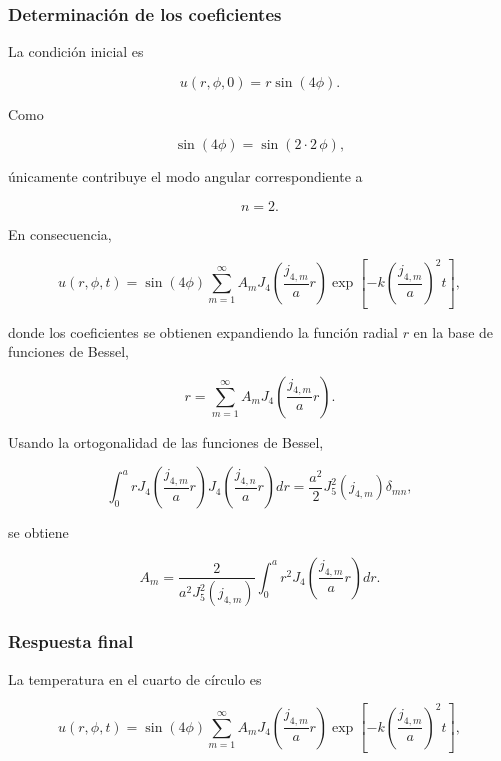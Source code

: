 \documentclass[12pt]{article}
\begin{document}
\subsubsection*{Determinación de los coeficientes}

La condición inicial es

\begin{equation}
u(r,\phi,0)=r\sin(4\phi).
\end{equation}

Como

\[
\sin(4\phi)=\sin(2\cdot2\,\phi),
\]

únicamente contribuye el modo angular correspondiente a

\[
n=2.
\]

En consecuencia,

\begin{equation}
u(r,\phi,t)
=
\sin(4\phi)
\sum_{m=1}^{\infty}
A_m
J_4
\!\left(
\frac{j_{4,m}}{a}r
\right)
\exp
\!\left[
-k
\left(
\frac{j_{4,m}}{a}
\right)^2
t
\right],
\end{equation}

donde los coeficientes se obtienen expandiendo la función radial $r$ en la base de funciones de Bessel,

\begin{equation}
r
=
\sum_{m=1}^{\infty}
A_m
J_4
\!\left(
\frac{j_{4,m}}{a}r
\right).
\end{equation}

Usando la ortogonalidad de las funciones de Bessel,

\begin{equation}
\int_0^a
r
J_4
\!\left(
\frac{j_{4,m}}{a}r
\right)
J_4
\!\left(
\frac{j_{4,n}}{a}r
\right)
dr
=
\frac{a^2}{2}
J_5^2(j_{4,m})
\delta_{mn},
\end{equation}

se obtiene

\begin{equation}
A_m=
\frac{2}
{a^2J_5^2(j_{4,m})}
\int_0^a
r^2
J_4
\!\left(
\frac{j_{4,m}}{a}r
\right)
dr.
\end{equation}

\subsubsection*{Respuesta final}

La temperatura en el cuarto de círculo es

\begin{equation}
\boxed{
u(r,\phi,t)
=
\sin(4\phi)
\sum_{m=1}^{\infty}
A_m
J_4
\!\left(
\frac{j_{4,m}}{a}r
\right)
\exp
\!\left[
-k
\left(
\frac{j_{4,m}}{a}
\right)^2
t
\right],
}
\end{equation}
\end{document}
